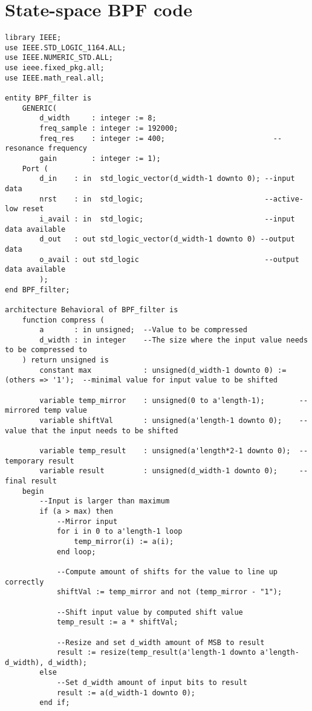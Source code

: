 \section*{State-space BPF code}
\begin{lstlisting}
library IEEE;
use IEEE.STD_LOGIC_1164.ALL;
use IEEE.NUMERIC_STD.ALL;
use ieee.fixed_pkg.all;
use IEEE.math_real.all;

entity BPF_filter is
    GENERIC(
        d_width     : integer := 8;
        freq_sample : integer := 192000;
        freq_res    : integer := 400;                         --resonance frequency
        gain        : integer := 1);
    Port ( 
        d_in    : in  std_logic_vector(d_width-1 downto 0); --input data
        nrst    : in  std_logic;                            --active-low reset
        i_avail : in  std_logic;                            --input data available
        d_out   : out std_logic_vector(d_width-1 downto 0) --output data
        o_avail : out std_logic                             --output data available
        ); 
end BPF_filter;

architecture Behavioral of BPF_filter is
    function compress (
        a       : in unsigned;  --Value to be compressed
        d_width : in integer    --The size where the input value needs to be compressed to
    ) return unsigned is
        constant max            : unsigned(d_width-1 downto 0) := (others => '1');  --minimal value for input value to be shifted

        variable temp_mirror    : unsigned(0 to a'length-1);        --mirrored temp value
        variable shiftVal       : unsigned(a'length-1 downto 0);    --value that the input needs to be shifted

        variable temp_result    : unsigned(a'length*2-1 downto 0);  --temporary result
        variable result         : unsigned(d_width-1 downto 0);     --final result
    begin
        --Input is larger than maximum 
        if (a > max) then
            --Mirror input
            for i in 0 to a'length-1 loop
                temp_mirror(i) := a(i);
            end loop;

            --Compute amount of shifts for the value to line up correctly
            shiftVal := temp_mirror and not (temp_mirror - "1");

            --Shift input value by computed shift value
            temp_result := a * shiftVal;

            --Resize and set d_width amount of MSB to result
            result := resize(temp_result(a'length-1 downto a'length-d_width), d_width);
        else
            --Set d_width amount of input bits to result
            result := a(d_width-1 downto 0);
        end if;


\end{lstlisting}
